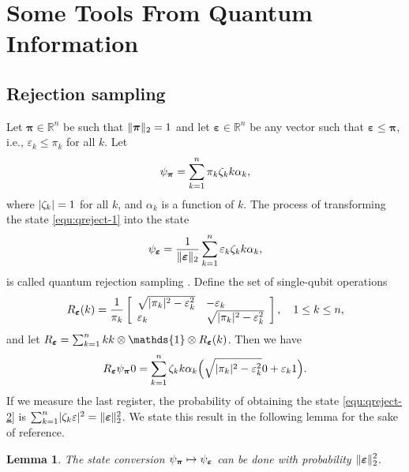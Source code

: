 \documentclass[11pt]{article}
\theoremstyle{plain}
\newtheorem{lemma}[theorem]{Lemma}
\theoremstyle{definition}
\DeclarePairedDelimiter{\abs}{\lvert}{\rvert}
\let\ket\relax
\DeclarePairedDelimiter{\ket}{\lvert}{\rangle}
\let\bra\relax
\DeclarePairedDelimiter{\bra}{\langle}{\rvert}
\DeclarePairedDelimiter{\opnorm}{\lVert}{\rVert}
\def\R{\mathbb{R}}
\begin{document}



\section{Some Tools From Quantum Information}


\subsection{Rejection sampling}

Let $\bm{\pi} \in \R^n$ be such that $\opnorm{\bm{\pi}}_2 = 1$ and let $\bm{\varepsilon} \in \R^n$ be any vector such that $\bm{\varepsilon} \le \bm{\pi}$, i.e., $\varepsilon_k \le \pi_k$ for all $k$. Let
\begin{equation}
    \label{equ:qreject-1}
    \ket{\psi_{\bm{\pi}}} = \sum_{k = 1}^n \pi_k\zeta_k \ket{k}\ket{\alpha_k},
\end{equation}
where $\abs{\zeta_k} = 1$ for all $k$, and $\alpha_k$ is a function of $k$. The process of transforming the state \eqref{equ:qreject-1} into the state
\begin{equation}
    \label{equ:qreject-2}
    \ket{\psi_{\bm{\varepsilon}}} = \frac{1}{\opnorm{\bm{\varepsilon}}_2} \sum_{k = 1}^n \varepsilon_k\zeta_k \ket{k}\ket{\alpha_k},
\end{equation}
is called quantum rejection sampling \cite{ozols2013quantum}. Define the set of single-qubit operations
\[ R_{\bm{\varepsilon}}(k) = \frac{1}{\pi_k}
\left[
\begin{array}{ll}
    \sqrt{\abs{\pi_k}^2 - \varepsilon_k^2} & -\varepsilon_k \\
    \varepsilon_k &\sqrt{\abs{\pi_k}^2 - \varepsilon_k^2}
\end{array}
\right]
, \quad 1 \le k \le n,
\]
and let $R_{\bm{\varepsilon}} = \sum_{k = 1}^n \ket{k}\bra{k} \otimes \mathds{1} \otimes R_{\bm{\varepsilon}}(k)$. Then we have
\[ R_{\bm{\varepsilon}} \ket{\psi_{\bm{\pi}}}\ket{0} = \sum_{k = 1}^n \zeta_k \ket{k}\ket{\alpha_k} \Big( \sqrt{\abs{\pi_k}^2 - \varepsilon_k^2}\ket{0} + \varepsilon_k\ket{1} \Big). \]
If we measure the last register, the probability of obtaining the state \eqref{equ:qreject-2} is $\sum_{k = 1}^n \abs{\zeta_k\varepsilon}^2 = \lVert \bm{\varepsilon} \rVert_2^2$. We state this result in the following lemma for the sake of reference.
\begin{lemma}
    \label{lem:qrs}
    The state conversion $\ket{\psi_{\bm{\pi}}} \mapsto \ket{\psi_{\bm{\varepsilon}}}$ can be done with probability $\opnorm{\displaystyle \bm{\varepsilon}}_2^2$.
\end{lemma}
\end{document}
